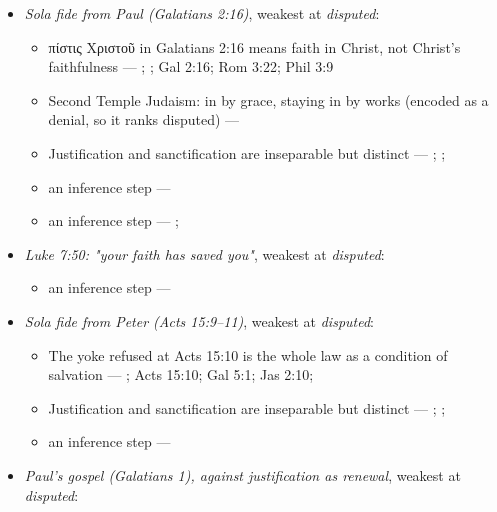 \documentclass[11pt]{article}
\begin{document}
\begin{itemize}
\begin{itemize}
\end{itemize}
\item \emph{Sola fide from Paul (Galatians 2:16)}, weakest at \emph{disputed}:
\begin{itemize}
\item πίστις Χριστοῦ in Galatians 2:16 means faith in Christ, not Christ's faithfulness --- \cite{dunn-once-more-pistis-christou-1991}; \cite{matlock-detheologizing-2000}; Gal 2:16; Rom 3:22; Phil 3:9
\item Second Temple Judaism: in by grace, staying in by works (encoded as a denial, so it ranks disputed) --- \cite{sanders-paul-palestinian-judaism-1977}
\item Justification and sanctification are inseparable but distinct --- \cite[XIII.1]{westminster-confession-1647}; \cite[XI.1]{westminster-confession-1647}; \cite[III.xi.6]{calvin-institutes-1960}
\item an inference step --- \cite[Trent, Session VI (1547), canon 9]{tanner-decrees-1990}
\item an inference step --- \cite{gathercole-where-boasting-2002}; \cite{carson-variegated-nomism-1-2001}
\end{itemize}
\item \emph{Luke 7:50: "your faith has saved you"}, weakest at \emph{disputed}:
\begin{itemize}
\item an inference step --- \cite[Trent, Session VI (1547), canon 9]{tanner-decrees-1990}
\end{itemize}
\item \emph{Sola fide from Peter (Acts 15:9–11)}, weakest at \emph{disputed}:
\begin{itemize}
\item The yoke refused at Acts 15:10 is the whole law as a condition of salvation --- \cite[ad loc. Acts 15:10]{bruce-acts-1988}; Acts 15:10; Gal 5:1; Jas 2:10; \cite{das-paul-law-covenant-2001}
\item Justification and sanctification are inseparable but distinct --- \cite[XIII.1]{westminster-confession-1647}; \cite[XI.1]{westminster-confession-1647}; \cite[III.xi.6]{calvin-institutes-1960}
\item an inference step --- \cite[Trent, Session VI (1547), canon 9]{tanner-decrees-1990}
\end{itemize}
\item \emph{Paul's gospel (Galatians 1), against justification as renewal}, weakest at \emph{disputed}:
\begin{itemize}

\end{itemize}
\end{itemize}
\end{document}
